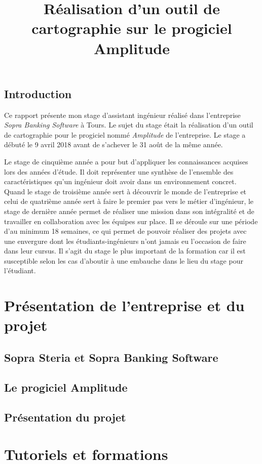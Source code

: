 \documentclass{polytech/polytech}
\title{Réalisation d'un outil de cartographie sur le progiciel Amplitude}
\begin{document}
\chapter*{Introduction}


Ce rapport présente mon stage d'assistant ingénieur réalisé dans l'entreprise \textit{Sopra Banking Software} à Tours. Le sujet du stage était la réalisation d'un outil de cartographie pour le progiciel nommé \textit{Amplitude} de l'entreprise. Le stage a débuté le 9 avril 2018 avant de s'achever le 31 août de la même année.

Le stage de cinquième année a pour but d'appliquer les connaissances acquises lors des années d'étude. Il doit représenter une synthèse de l'ensemble des caractéristiques qu'un ingénieur doit avoir dans un environnement concret. Quand le stage de troisième année sert à découvrir le monde de l'entreprise et celui de quatrième année sert à faire le premier pas vers le métier d'ingénieur, le stage de dernière année permet de réaliser une mission dans son intégralité et de travailler en collaboration avec les équipes sur place. Il se déroule sur une période d'au minimum 18 semaines, ce qui permet de pouvoir réaliser des projets avec une envergure dont les étudiants-ingénieurs n'ont jamais eu l'occasion de faire dans leur cursus. Il s'agit du stage le plus important de la formation car il est susceptible selon les cas d'aboutir à une embauche dans le lieu du stage pour l'étudiant. 


\part{Présentation de l'entreprise et du projet}


\chapter{Sopra Steria et Sopra Banking Software}


\chapter{Le progiciel Amplitude}


\chapter{Présentation du projet}


\part{Tutoriels et formations}
\end{document}
